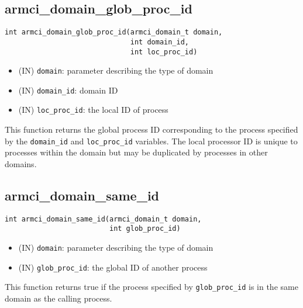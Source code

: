 \documentclass[12pt]{article}
\begin{document}
\subsection{armci\_domain\_glob\_proc\_id}
\begin{verbatim}
int armci_domain_glob_proc_id(armci_domain_t domain,
                              int domain_id,
                              int loc_proc_id)
\end{verbatim}
\begin{itemize}
\item (IN) \texttt{domain}: parameter describing the type of domain
\item (IN) \texttt{domain\_id}: domain ID
\item (IN) \texttt{loc\_proc\_id}: the local ID of process
\end{itemize}
This function returns the global process ID corresponding to the process
specified by the \texttt{domain\_id} and \texttt{loc\_proc\_id} variables. The
local processor ID is unique to processes within the domain but may be
duplicated by processes in other domains.

\subsection{armci\_domain\_same\_id}
\begin{verbatim}
int armci_domain_same_id(armci_domain_t domain,
                         int glob_proc_id)
\end{verbatim}
\begin{itemize}
\item (IN) \texttt{domain}: parameter describing the type of domain
\item (IN) \texttt{glob\_proc\_id}: the global ID of another process
\end{itemize}
This function returns true if the process specified by \texttt{glob\_proc\_id}
is in the same domain as the calling process.
\end{document}
